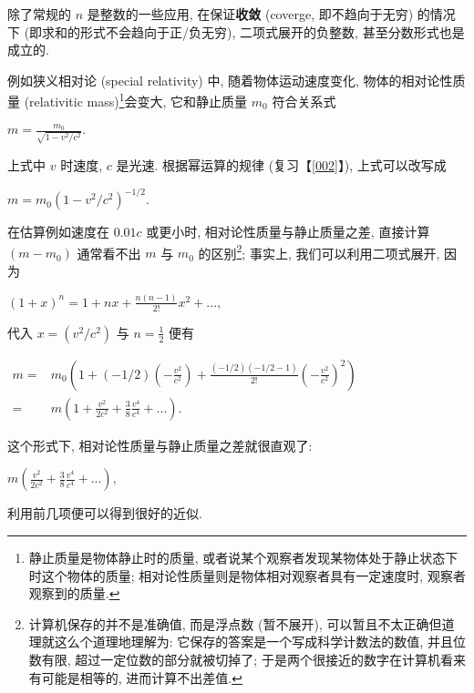 \begin{tcolorbox}[size=fbox, breakable, enhanced jigsaw, title={应用}]

除了常规的 $n$ 是整数的一些应用, 在保证\textbf{收敛}
(coverge, 即不趋向于无穷) 的情况下 (即求和的形式不会趋向于正/负无穷),
二项式展开的负整数, 甚至分数形式也是成立的.

例如狭义相对论 (special relativity) 中, 随着物体运动速度变化,
物体的相对论性质量 (relativitic mass)\footnote{静止质量是物体静止时的质量,
  或者说某个观察者发现某物体处于静止状态下时这个物体的质量;
  相对论性质量则是物体相对观察者具有一定速度时, 观察者观察到的质量.}会变大,
它和静止质量 $m_0$ 符合关系式

$m=\frac{m_0}{\sqrt{1-v^2/c^2}}.$

上式中 $v$ 时速度, $c$ 是光速. 根据幂运算的规律 (复习【\ref{002}】),
上式可以改写成

$m=m_0(1-v^2/c^2)^{-1/2}.$

在估算例如速度在 $0.01c$ 或更小时, 相对论性质量与静止质量之差,
直接计算 $(m-m_0)$ 通常看不出 $m$ 与 $m_0$ 的区别\footnote{计算机保存的并不是准确值,
  而是浮点数 (暂不展开), 可以暂且不太正确但道理就这么个道理地理解为:
  它保存的答案是一个写成科学计数法的数值, 并且位数有限,
  超过一定位数的部分就被切掉了;
  于是两个很接近的数字在计算机看来有可能是相等的, 进而计算不出差值.};
事实上, 我们可以利用二项式展开, 因为

$(1+x)^n=1+nx+\frac{n(n-1)}{2!}x^2+...,$

代入 $x=(v^2/c^2)$ 与 $n=\frac{1}{2}$ 便有

$\begin{aligned}m=&m_0\left(1+(-1/2)\left(-\frac{v^2}{c^2}\right)+\frac{(-1/2)(-1/2-1)}{2!}\left(-\frac{v^2}{c^2}\right)^2\right)\\=&m\left(1+\frac{v^2}{2c^2}+\frac{3}{8}\frac{v^4}{c^4}+...\right).\end{aligned}$

这个形式下, 相对论性质量与静止质量之差就很直观了:

$m\left(\frac{v^2}{2c^2}+\frac{3}{8}\frac{v^4}{c^4}+...\right),$

利用前几项便可以得到很好的近似.

\end{tcolorbox}